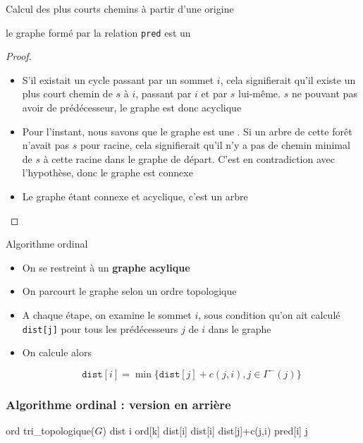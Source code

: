 \begin{frame}{Calcul des plus courts chemins à partir d'une origine}
    \begin{theorem}
        le graphe formé par la relation \texttt{pred} est un \arbre
    \end{theorem}
        \begin{proof}
            \begin{itemize}
                \item S'il existait un cycle passant par un sommet $i$, cela signifierait qu'il existe un plus court chemin de $s$ à $i$, passant par $i$ et par $s$ lui-même. $s$ ne pouvant pas avoir de prédécesseur, le graphe est donc acyclique 
            \item Pour l'instant, nous savons que le graphe est une \foret. Si un arbre de cette forêt n'avait pas $s$ pour racine, cela signifierait qu'il n'y a pas de chemin minimal de $s$ à cette racine dans le graphe de départ. C'est en contradiction avec l'hypothèse, donc le graphe est connexe
            \item Le graphe étant connexe et acyclique, c'est un arbre 
        \end{itemize}
    \end{proof}
\end{frame}

\begin{frame}{Algorithme ordinal}
    \begin{itemize}
        \item On se restreint à un \textbf{graphe acylique}
        \item On parcourt le graphe selon un ordre topologique
        \item A chaque étape, on examine le sommet $i$, sous condition qu'on ait calculé \texttt{dist[j]} pour tous les prédécesseurs $j$ de $i$ dans le graphe 
        \item On calcule alors 

        $$
        \mathtt{dist}[i] = \min \{  \mathtt{dist}[j] + c(j,i), j \in \Gamma^{-}(j)\}
        $$
    \end{itemize}
\end{frame}

\begin{frame}[fragile]
    \frametitle{Algorithme ordinal : version en arrière}
    \begin{algorithmic}[1]
        \State ord \gets tri\_topologique($G$)
        \State dist  
            \State i \gets ord[k]
                dist[i] 
            \Else
                        \State dist[i] \gets  dist[j]+c(j,i)
                        \State pred[i] \gets j
                    \EndIf
                \EndFor 
            \EndIf  
        \EndFor
        \EndFunction
    \end{algorithmic}
\end{frame}

